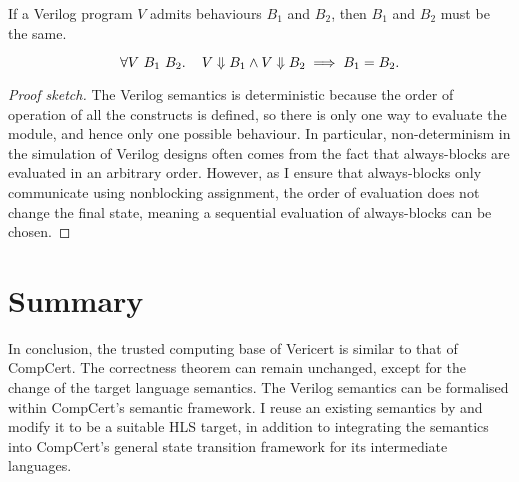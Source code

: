 \begin{lemma}\label{lemma:deterministic}
  If a Verilog program $V\!$ admits behaviours $B_1$ and $B_2$, then $B_1$ and
  $B_2$ must be the same.

  \begin{equation*}
    \forall V\ B_{1}\ B_{2}\ldotp\quad V \Downarrow B_{1} \land V \Downarrow B_{2} \implies B_{1} = B_{2}.
  \end{equation*}
\end{lemma}

\begin{proof}[Proof sketch]
  The Verilog semantics is deterministic because the order of operation of all
  the constructs is defined, so there is only one way to evaluate the module,
  and hence only one possible behaviour.  In particular, non-determinism in the
  simulation of Verilog designs often comes from the fact that always-blocks are
  evaluated in an arbitrary order.  However, as I ensure that always-blocks only
  communicate using nonblocking assignment, the order of evaluation does not
  change the final state, meaning a sequential evaluation of always-blocks can
  be chosen.
\end{proof}

\section{Summary}

In conclusion, the trusted computing base of Vericert is similar to that of
CompCert.  The correctness theorem can remain unchanged, except for the change
of the target language semantics.  The Verilog semantics can be formalised
within CompCert's semantic framework.  I reuse an existing semantics by
\textcite{lööw19_proof_trans_veril_devel_hol} and modify it to be a suitable
\gls{HLS} target, in addition to integrating the semantics into CompCert's
general state transition framework for its intermediate languages.


